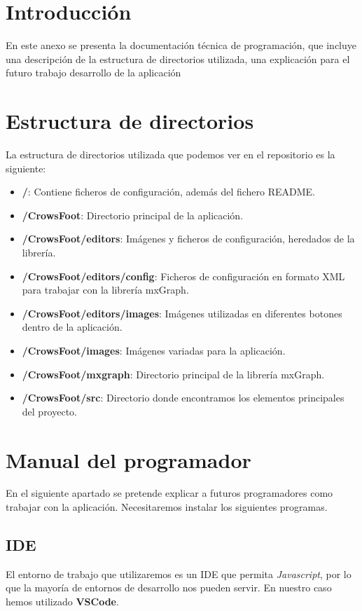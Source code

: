 
\section{Introducción}
En este anexo se presenta la documentación técnica de programación, que incluye una descripción de la estructura de directorios utilizada, una explicación para el futuro trabajo desarrollo de la aplicación

\section{Estructura de directorios}
La estructura de directorios utilizada que podemos ver en el repositorio es la siguiente:
\begin{itemize}
    \item \textbf{/}: Contiene ficheros de configuración, además del fichero README.
    \item \textbf{/CrowsFoot}: Directorio principal de la aplicación.
    \item \textbf{/CrowsFoot/editors}: Imágenes y ficheros de configuración, heredados de la librería.
    \item \textbf{/CrowsFoot/editors/config}: Ficheros de configuración en formato XML para trabajar con la librería mxGraph.
    \item \textbf{/CrowsFoot/editors/images}: Imágenes utilizadas en diferentes botones dentro de la aplicación.
    \item \textbf{/CrowsFoot/images}: Imágenes variadas para la aplicación.
    \item \textbf{/CrowsFoot/mxgraph}: Directorio principal de la librería mxGraph.
    \item \textbf{/CrowsFoot/src}: Directorio donde encontramos los elementos principales del proyecto.
\end{itemize}

\section{Manual del programador}
En el siguiente apartado se pretende explicar a futuros programadores como trabajar con la aplicación. Necesitaremos instalar los siguientes programas.

\subsection{IDE}
El entorno de trabajo que utilizaremos es un IDE que permita \emph{Javascript}, por lo que la mayoría de entornos de desarrollo nos pueden servir. En nuestro caso hemos utilizado \textbf{VSCode}.

